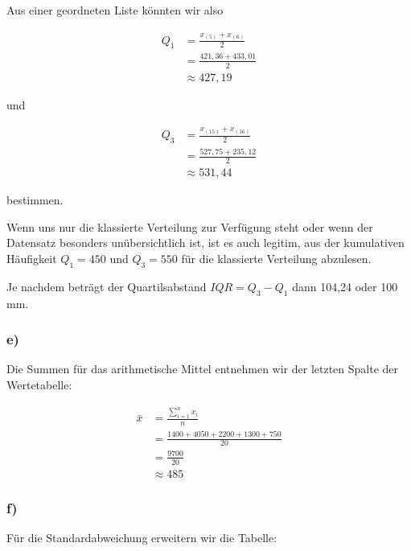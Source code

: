 \documentclass[
  11pt,
  ngerman,
  a4paper,
]{report}
\begin{document}
Aus einer geordneten Liste könnten wir also

\[\begin{aligned}
Q_1&=\frac{x_{(5)}+x_{(6)}}{2}\\
   &=\frac{421{,}36+433{,}01}{2}\\
   &\approx427{,}19
\end{aligned}\]

und

\[\begin{aligned}
Q_3&=\frac{x_{(15)}+x_{(16)}}{2}\\
   &=\frac{527{,}75+235{,}12}{2}\\
   &\approx531{,}44
\end{aligned}\]

bestimmen.

Wenn uns nur die klassierte Verteilung zur Verfügung steht oder wenn der Datensatz besonders unübersichtlich ist, ist es auch legitim, aus der kumulativen Häufigkeit \(Q_1=450\) und \(Q_3=550\) für die klassierte Verteilung abzulesen.

Je nachdem beträgt der Quartilsabstand \(\mathit{IQR}=Q_3-Q_1\) dann 104,24 oder 100 mm.

\hypertarget{e}{%
\subsubsection{e)}\label{e}}

Die Summen für das arithmetische Mittel entnehmen wir der letzten Spalte der Wertetabelle:

\[\begin{aligned}
  \bar{x}&=\frac{\sum\limits_{i=1}^nx_i}{n} \\
         &=\frac{1400+4050+2200+1300+750}{20} \\
         &=\frac{9700}{20} \\
         &\approx485
\end{aligned}\]

\hypertarget{f}{%
\subsubsection{f)}\label{f}}

Für die Standardabweichung erweitern wir die Tabelle:
\end{document}
